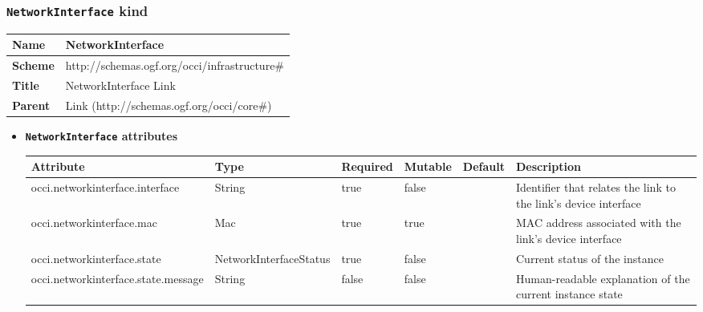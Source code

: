 \subsubsection{\texttt{NetworkInterface} kind}
\begin{center}
\begin{tabular}{|l|l|}
  \hline
  \textbf{Name} & NetworkInterface \\
  \hline  
  \textbf{Scheme} & http://schemas.ogf.org/occi/infrastructure\# \\
  \hline
  \textbf{Title} & NetworkInterface Link \\
  \hline
  \textbf{Parent} & Link (http://schemas.ogf.org/occi/core\#) \\
  \hline
\end{tabular}
\end{center}
\begin{itemize}
\item \textbf{\texttt{NetworkInterface} attributes}

\begin{tabularx}{\textwidth}{|l|l|p{1.4cm}|p{1.3cm}|l|X|}
  \hline
  \textbf{Attribute} & \textbf{Type} & \textbf{Required} & \textbf{Mutable} & \textbf{Default} & \textbf{Description} \\
  \hline  
  occi.networkinterface.interface & String & true & false &  & Identifier that relates the link to the link's device interface \\
  \hline
  occi.networkinterface.mac & Mac & true & true &  & MAC address associated with the link's device interface \\
  \hline
  occi.networkinterface.state & NetworkInterfaceStatus & true & false &  & Current status of the instance \\
  \hline
  occi.networkinterface.state.message & String & false & false &  & Human-readable explanation of the current instance state \\
  \hline
\end{tabularx}
\end{itemize}


